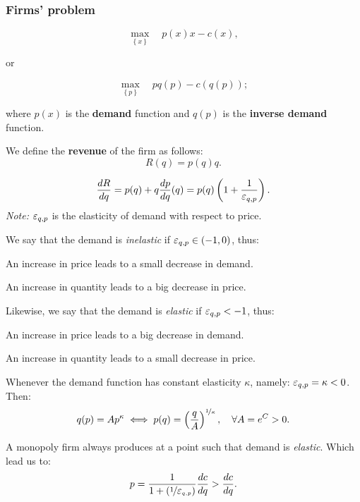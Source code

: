\documentclass[8pt,a4paper]{extarticle}
\begin{document}
\begin{multicols}{3}
  \subsubsection*{Firms' problem}

  \[\max_{\left\{ x \right\}} \quad p(x)x - c(x),\]

  or

  \[\max_{\left\{ p \right\}} \quad pq(p) - c(q(p));\]

  where $p(x)$ is the \textbf{demand} function and $q(p)$ is the \textbf{inverse demand} function.

  \begin{boxdef}[Revenue]
    We define the \textbf{revenue} of the firm as follows:
    \[R(q) = p(q)q.\]
  \end{boxdef}

  \begin{boxprop}
    \[\frac{dR}{dq} = p(q) + q \frac{dp}{dq}(q) = p(q) \left( 1 + \frac{1}{\E_{q,p}} \right).\]
    \emph{Note:} $\E_{q,p}$ is the elasticity of demand with respect to price.
  \end{boxprop}

  \begin{boxprop}
    We say that the demand is \emph{inelastic} if $\E_{q,p} \in (-1,0)$, thus:
    \begin{bulletlist}
      \item An increase in price leads to a small decrease in demand.
      \item An increase in quantity leads to a big decrease in price.
    \end{bulletlist}
    Likewise, we say that the demand is \emph{elastic} if $\E_{q,p} < -1$, thus:
    \begin{bulletlist}
      \item An increase in price leads to a big decrease in demand.
      \item An increase in quantity leads to a small decrease in price.
    \end{bulletlist}
  \end{boxprop}

  \begin{boxprop}
    Whenever the demand function has constant elasticity $\kappa$, namely: $\E_{q,p} = \kappa < 0$. Then:
    \[q(p) = Ap^\kappa \iff p(q) = \left( \frac{q}{A} \right)^{\nicefrac{1}{\kappa}}, \quad \forall A = e^C > 0.\]
  \end{boxprop}

  \begin{boxrmk}
    A monopoly firm always produces at a point such that demand is \emph{elastic}. Which lead us to:
    \[p = \frac{1}{1 + \left(\displaystyle \nicefrac{1}{\E_{q,p}}\right)} \frac{dc}{dq} > \frac{dc}{dq}.\]
  \end{boxrmk}


\end{multicols}
\end{document}
